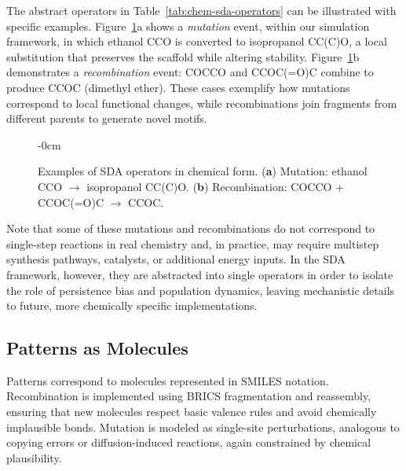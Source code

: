 \documentclass[life,article,submit,pdftex,moreauthors]{Definitions/mdpi}
\begin{document}
The abstract operators in Table~\ref{tab:chem-sda-operators} can be illustrated with specific examples. 
Figure~\ref{fig:mutation-recombination}a shows a \textit{mutation} event, within our
simulation framework, in which ethanol CCO is converted to isopropanol CC(C)O, 
a local substitution that preserves the scaffold while altering stability. 
Figure~\ref{fig:mutation-recombination}b demonstrates a \textit{recombination} event: 
COCCO and CCOC(=O)C combine to produce CCOC (dimethyl ether). 
These cases exemplify how mutations correspond to local functional changes, 
while recombinations join fragments from different parents to generate novel motifs. 


\begin{figure}[H]
\begin{adjustwidth}{-\extralength}{0cm}
\centering
{}
\hspace{0.4cm}
\end{adjustwidth}
\caption{Examples of SDA operators in chemical form. (\textbf{a}) Mutation: ethanol CCO $\to$ isopropanol CC(C)O. 
(\textbf{b}) Recombination: COCCO + CCOC(=O)C $\to$ CCOC.}
\label{fig:mutation-recombination}
\end{figure}

Note that some of these mutations and recombinations do not correspond to single-step reactions in real chemistry and, in practice, may require multistep synthesis pathways, catalysts, or additional energy inputs. In the SDA framework, however, they are abstracted into single operators in order to isolate the role of persistence bias and population dynamics, leaving mechanistic details to future, more chemically specific implementations.


\subsection{Patterns as Molecules}
Patterns correspond to molecules represented in SMILES notation. Recombination is implemented 
using BRICS fragmentation and reassembly, ensuring that new molecules respect basic valence 
rules and avoid chemically implausible bonds. Mutation is modeled as single-site perturbations, 
analogous to copying errors or diffusion-induced reactions, again constrained by chemical 
plausibility.
\end{document}
